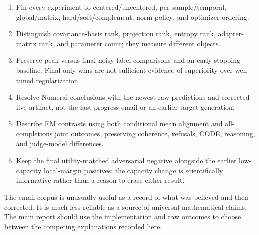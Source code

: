 \documentclass[
  british,
  10pt,
  a4paper,
]{article}
\providecommand{\tightlist}{%
  \setlength{\itemsep}{0pt}\setlength{\parskip}{0pt}}
\begin{document}
\begin{enumerate}
\def\labelenumi{\arabic{enumi}.}
\tightlist
\item
  Pin every experiment to centered/\allowbreak{}uncentered,\allowbreak{}
  per-\allowbreak{}sample/\allowbreak{}temporal,\allowbreak{}
  global/\allowbreak{}matrix,\allowbreak{}
  hard/\allowbreak{}soft/\allowbreak{}complement,\allowbreak{} norm
  policy, and optimizer ordering.
\item
  Distinguish covariance-\allowbreak{}basis rank, projection rank,
  entropy rank, adapter-\allowbreak{}matrix rank, and parameter count;
  they measure different objects.
\item
  Preserve peak-\allowbreak{}versus-\allowbreak{}final
  noisy-\allowbreak{}label comparisons and an
  early-\allowbreak{}stopping baseline. Final-only wins are not
  sufficient evidence of superiority over well-tuned
  regularizati\allowbreak{}on.\allowbreak{}
\item
  Resolve Numerai conclusions with the newest raw predictions and
  corrected live artifact, not the last progress email or an earlier
  target generation.\allowbreak{}
\item
  Describe EM contrasts using both conditional mean alignment and
  all-\allowbreak{}completions joint outcomes, preserving coherence,
  refusals, CODE, reasoning, and judge-\allowbreak{}model
  differences.\allowbreak{}
\item
  Keep the final utility-\allowbreak{}matched adversarial negative
  alongside the earlier low-\allowbreak{}capacity
  local-\allowbreak{}margin positives; the capacity change is
  scientifically informative rather than a reason to erase either
  result.
\end{enumerate}

The email corpus is unusually useful as a record of what was believed
and then corrected. It is much less reliable as a source of universal
mathematical claims. The main report should use the implementation and
raw outcomes to choose between the competing explanations recorded here.
\end{document}
